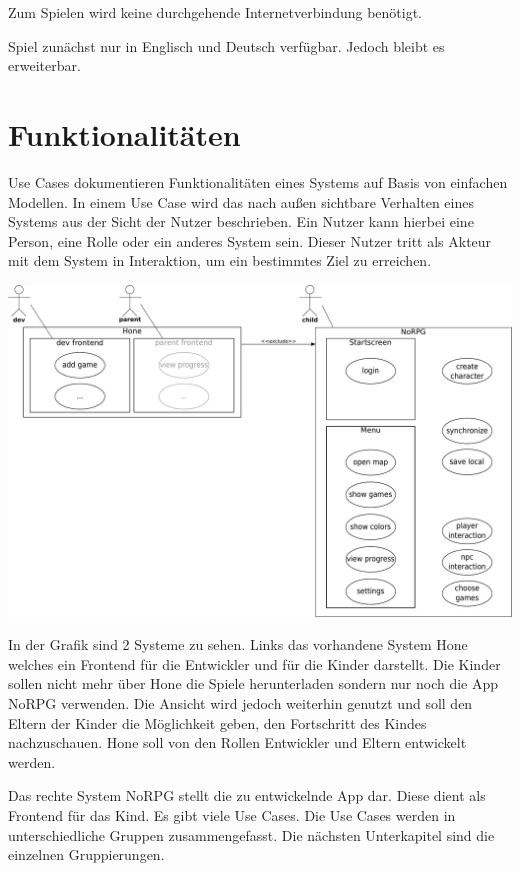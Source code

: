 		Zum Spielen wird keine durchgehende Internetverbindung benötigt. 
		
		Spiel zunächst nur in Englisch und Deutsch verfügbar. Jedoch bleibt es erweiterbar.

\section{Funktionalitäten}
	Use Cases dokumentieren Funktionalitäten eines Systems auf Basis von einfachen Modellen. In einem Use Case wird das nach außen sichtbare Verhalten eines Systems aus der Sicht der Nutzer beschrieben. Ein Nutzer kann hierbei eine Person, eine Rolle oder ein anderes System sein. Dieser Nutzer tritt als Akteur mit dem System in Interaktion, um ein bestimmtes Ziel zu erreichen.
	
	\begin{center}
		\includegraphics[width=\textwidth]{pics/OUCD.pdf}
	\end{center}
	
	In der Grafik sind 2 Systeme zu sehen. Links das vorhandene System Hone welches ein Frontend für die Entwickler und für die Kinder darstellt. Die Kinder sollen nicht mehr über Hone die Spiele herunterladen sondern nur noch die App NoRPG verwenden. Die Ansicht wird jedoch weiterhin genutzt und soll den Eltern der Kinder die Möglichkeit geben, den Fortschritt des Kindes nachzuschauen. Hone soll von den Rollen Entwickler und Eltern entwickelt werden.
	
	Das rechte System NoRPG stellt die zu entwickelnde App dar. Diese dient als Frontend für das Kind. Es gibt viele Use Cases. Die Use Cases werden in unterschiedliche Gruppen zusammengefasst. Die nächsten Unterkapitel sind die einzelnen Gruppierungen.
	

